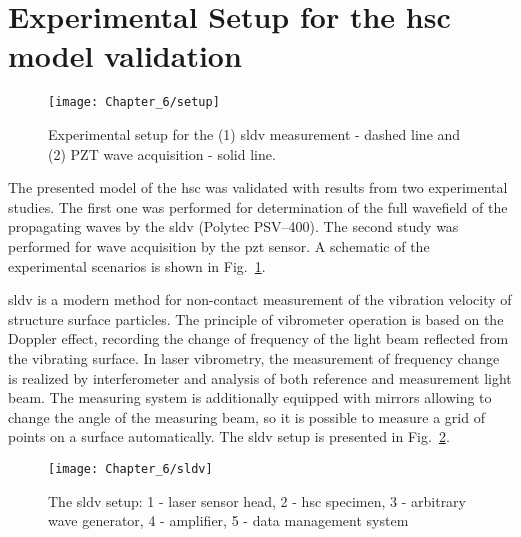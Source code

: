 \section{Experimental Setup for the \ac{hsc} model validation}
\label{sec:setup}
\begin{figure}[H]
	\begin{center}
		\texttt{[image: Chapter\_6/setup]}
	\end{center}
	\caption{Experimental setup for the (1) \ac{sldv} measurement - dashed line and (2) PZT wave acquisition - solid line.}
	\label{fig:setup}
\end{figure}
The presented model of the \ac{hsc} was validated with results from two experimental studies.
The first one was performed for determination of the full wavefield of the propagating waves by the \ac{sldv} (Polytec PSV–400).
The second study was performed for wave acquisition by the \ac{pzt} sensor.
A schematic of the experimental scenarios is shown in Fig.~\ref{fig:setup}.

\ac{sldv} is a modern method for non-contact measurement of the vibration velocity of structure surface particles.
The principle of vibrometer operation is based on the Doppler effect, recording the change of frequency of the light beam reflected from the vibrating surface.
In laser vibrometry, the measurement of frequency change is realized by interferometer and analysis of both reference and measurement light beam.
The measuring system is additionally equipped with mirrors allowing to change the angle of the measuring beam, so it is possible to measure a grid of points on a surface automatically.
The \ac{sldv} setup is presented in Fig.~\ref{fig:sldv}.
\begin{figure}
	\begin{center}
		\texttt{[image: Chapter\_6/sldv]}
	\end{center}
	\caption{The \ac{sldv} setup: 1 - laser sensor head, 2 - \ac{hsc} specimen, 3 - arbitrary wave generator, 4 - amplifier, 5 - data management system}
	\label{fig:sldv}
\end{figure}

